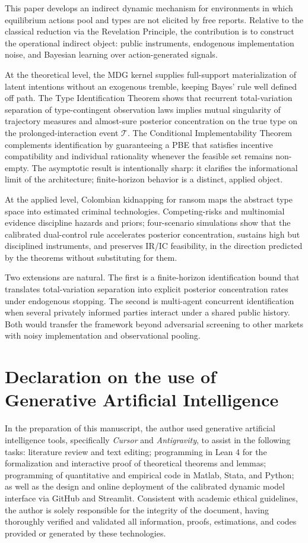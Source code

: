 \documentclass[review,authoryear,12pt]{elsarticle}
\theoremstyle{plain}
\theoremstyle{definition}
\newcommand{\1}{\mathbf{1}}
\begin{document}
This paper develops an indirect dynamic mechanism for environments in which equilibrium actions pool and types are not elicited by free reports. Relative to the classical reduction via the Revelation Principle, the contribution is to construct the operational indirect object: public instruments, endogenous implementation noise, and Bayesian learning over action-generated signals.

At the theoretical level, the MDG kernel supplies full-support materialization of latent intentions without an exogenous tremble, keeping Bayes' rule well defined off path. The Type Identification Theorem shows that recurrent total-variation separation of type-contingent observation laws implies mutual singularity of trajectory measures and almost-sure posterior concentration on the true type on the prolonged-interaction event $\mathcal{T}$. The Conditional Implementability Theorem complements identification by guaranteeing a PBE that satisfies incentive compatibility and individual rationality whenever the feasible set remains non-empty. The asymptotic result is intentionally sharp: it clarifies the informational limit of the architecture; finite-horizon behavior is a distinct, applied object.

At the applied level, Colombian kidnapping for ransom maps the abstract type space into estimated criminal technologies. Competing-risks and multinomial evidence discipline hazards and priors; four-scenario simulations show that the calibrated dual-control rule accelerates posterior concentration, sustains high but disciplined instruments, and preserves IR/IC feasibility, in the direction predicted by the theorems without substituting for them.

Two extensions are natural. The first is a finite-horizon identification bound that translates total-variation separation into explicit posterior concentration rates under endogenous stopping. The second is multi-agent concurrent identification when several privately informed parties interact under a shared public history. Both would transfer the framework beyond adversarial screening to other markets with noisy implementation and observational pooling.


\section*{Declaration on the use of Generative Artificial Intelligence}

In the preparation of this manuscript, the author used generative artificial intelligence tools, specifically \emph{Cursor} and \emph{Antigravity}, to assist in the following tasks: literature review and text editing; programming in Lean 4 for the formalization and interactive proof of theoretical theorems and lemmas; programming of quantitative and empirical code in Matlab, Stata, and Python; as well as the design and online deployment of the calibrated dynamic model interface via GitHub and Streamlit. Consistent with academic ethical guidelines, the author is solely responsible for the integrity of the document, having thoroughly verified and validated all information, proofs, estimations, and codes provided or generated by these technologies.




\end{document}
